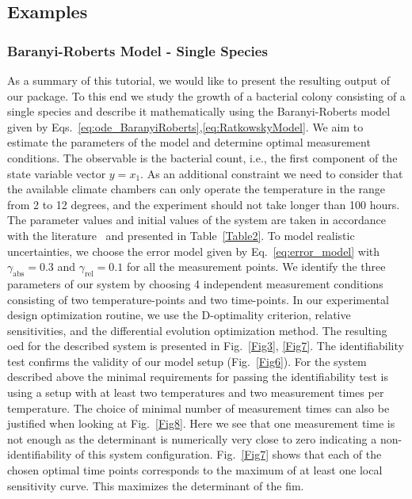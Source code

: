 \documentclass[graybox]{svmult}
\begin{document}
\subsection{Examples}
\subsubsection{Baranyi-Roberts Model - Single Species}
As a summary of this tutorial, we would like to present the resulting output of our package.
To this end we study the growth of a bacterial colony consisting of a single species and describe it mathematically using the Baranyi-Roberts model given by Eqs.~\ref{eq:ode_BaranyiRoberts},\ref{eq:RatkowskyModel}.
We aim to estimate the parameters of the model and determine optimal measurement conditions.
The observable is the bacterial count, i.e., the first component of the state variable vector $y = x_1$.
As an additional constraint we need to consider that the available climate chambers can only operate the temperature in the range from 2 to 12 degrees, and the experiment should not take longer than 100 hours.
The parameter values and initial values of the system are taken in accordance with the literature~\cite{gospavic_mathematical_2008} and presented in Table~\ref{Table2}.
%
To model realistic uncertainties, we choose the error model given by Eq.~\ref{eq:error_model} with $\gamma_\text{abs}=0.3$ and $\gamma_\text{rel}=0.1$ for all the measurement points.
We identify the three parameters of our system by choosing 4 independent measurement conditions consisting of two temperature-points and two time-points.
In our experimental design optimization routine, we use the D-optimality criterion, relative sensitivities, and the differential evolution optimization method.
The resulting \ac{oed} for the described system is presented in Fig.~\ref{Fig3}, \ref{Fig7}.
The identifiability test confirms the validity of our model setup (Fig.~\ref{Fig6}).
%
%
For the system described above the minimal requirements for passing the identifiability test is using a setup with at least two temperatures and two measurement times per temperature.
The choice of minimal number of measurement times can also be justified when looking at Fig.~\ref{Fig8}.
Here we see that one measurement time is not enough as the determinant is numerically very close to zero indicating a non-identifiability of this system configuration.
%
%
Fig.~\ref{Fig7} shows that each of the chosen optimal time points corresponds to the maximum of at least one local sensitivity curve.
This maximizes the determinant of the \acl{fim}.
%
%
%
\end{document}
